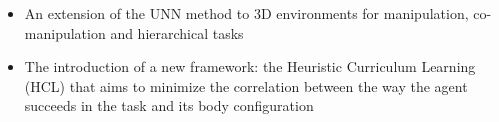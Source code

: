 \documentclass[letterpaper, 10 pt, conference]{ieeeconf}  %
\begin{document}

\begin{itemize}
  \item An extension of the UNN method to 3D environments for manipulation, co-manipulation and hierarchical tasks
  \item The introduction of a new framework: the Heuristic Curriculum Learning (HCL) that aims to minimize the correlation between the way the agent succeeds in the task and its body configuration
\end{itemize}

\end{document}
